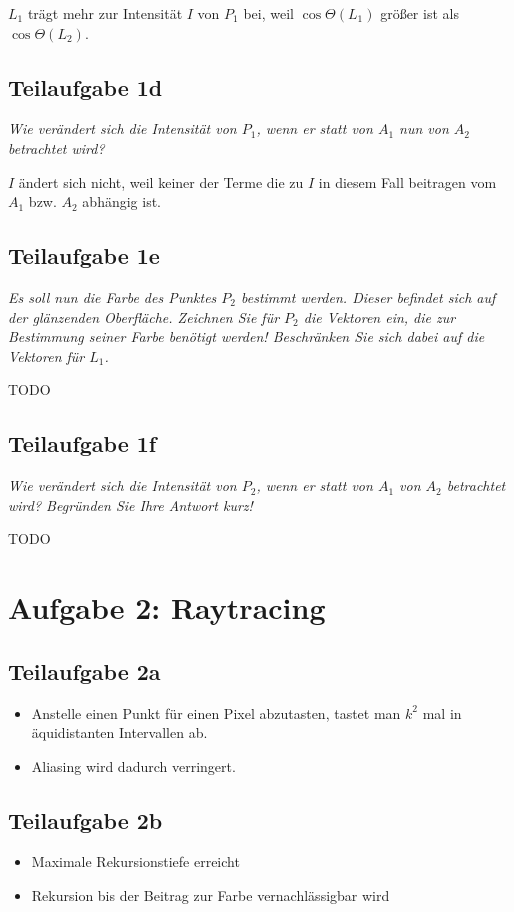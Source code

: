 \documentclass[a4paper]{scrartcl}
\begin{document}
$L_1$ trägt mehr zur Intensität $I$ von $P_1$ bei, weil $\cos \Theta(L_1)$ größer
ist als  $\cos \Theta(L_2)$.

\subsection*{Teilaufgabe 1d}
\textit{Wie verändert sich die Intensität von $P_1$, wenn er statt von $A_1$
nun von $A_2$ betrachtet wird?}

$I$ ändert sich nicht, weil keiner der Terme die zu $I$ in diesem Fall beitragen
vom $A_1$ bzw. $A_2$ abhängig ist.

\subsection*{Teilaufgabe 1e}
\textit{Es soll nun die Farbe des Punktes $P_2$ bestimmt werden. Dieser
befindet sich auf der glänzenden Oberfläche. Zeichnen Sie für $P_2$ die
Vektoren ein, die zur Bestimmung seiner Farbe benötigt werden! Beschränken Sie
sich dabei auf die Vektoren für $L_1$.}

TODO

\subsection*{Teilaufgabe 1f}
\textit{Wie verändert sich die Intensität von $P_2$, wenn er statt von $A_1$
von $A_2$ betrachtet wird? Begründen Sie Ihre Antwort kurz!}

TODO

\section*{Aufgabe 2: Raytracing}
\subsection*{Teilaufgabe 2a}
\begin{itemize}
    \item Anstelle einen Punkt für einen Pixel abzutasten, tastet man
          $k^2$ mal in äquidistanten Intervallen ab.
    \item Aliasing wird dadurch verringert.
\end{itemize}

\subsection*{Teilaufgabe 2b}
\begin{itemize}
    \item Maximale Rekursionstiefe erreicht
    \item Rekursion bis der Beitrag zur Farbe vernachlässigbar wird
\end{itemize}
\end{document}
